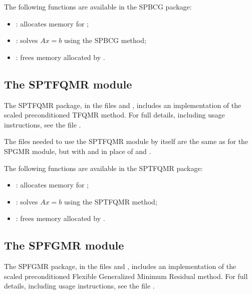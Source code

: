 \documentclass[letterpaper,10pt,english]{sphinxmanual}
\begin{document}
The following functions are available in the SPBCG package:
\begin{itemize}
\item {} 
: allocates memory for ;

\item {} 
: solves $Ax = b$ using the SPBCG method;

\item {} 
: frees memory allocated by .

\end{itemize}


\subsection{The SPTFQMR module}
\label{linear_solvers/SPILS:the-sptfqmr-module}
The SPTFQMR package, in the files  and
, includes an implementation of the scaled
preconditioned TFQMR method. For full details, including usage
instructions, see the file .

The files needed to use the SPTFQMR module by itself are the same as
for the SPGMR module, but with  and
 in place of  and
.

The following functions are available in the SPTFQMR package:
\begin{itemize}
\item {} 
: allocates memory for ;

\item {} 
: solves $Ax = b$ using the SPTFQMR method;

\item {} 
: frees memory allocated by .

\end{itemize}


\subsection{The SPFGMR module}
\label{linear_solvers/SPILS:the-spfgmr-module}
The SPFGMR package, in the files  and
, includes an implementation of the scaled
preconditioned Flexible Generalized Minimum Residual method. For full
details, including usage instructions, see the file
.
\end{document}
